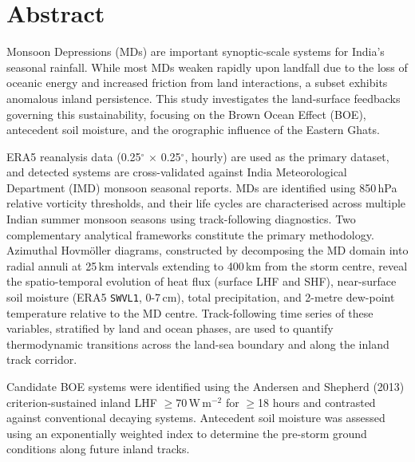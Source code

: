 
\cleardoublepage

\chapter*{Abstract}

  \large \textbf{\ThesisTitle}

  \vspace{0.5cm}

  \normalsize
  \noindent Monsoon Depressions (MDs) are important synoptic-scale
  systems for India's seasonal rainfall. While most MDs weaken
  rapidly upon landfall due to the loss of oceanic energy and
  increased friction from land interactions, a subset exhibits
  anomalous inland persistence. This study investigates the
  land-surface feedbacks governing this sustainability, focusing on
  the Brown Ocean Effect (BOE), antecedent soil moisture, and the
  orographic influence of the Eastern Ghats.

  \vspace{0.2cm}

  \noindent ERA5 reanalysis data (0.25\(^\circ\) $\times$
  0.25\(^\circ\), hourly) are used as the primary dataset, and
  detected systems are cross-validated against India Meteorological
  Department (IMD) monsoon seasonal reports. MDs are identified using
  850\,hPa relative vorticity thresholds, and their life cycles are
  characterised across multiple Indian summer monsoon seasons using
  track-following diagnostics. Two complementary analytical
  frameworks constitute the primary methodology. Azimuthal
  Hovm\"{o}ller diagrams, constructed by decomposing the MD domain
  into radial annuli at 25\,km intervals extending to 400\,km from
  the storm centre, reveal the spatio-temporal evolution of heat flux
  (surface LHF and SHF), near-surface soil moisture (ERA5
  \texttt{SWVL1}, 0-7\,cm), total precipitation, and 2-metre
  dew-point temperature relative to the MD centre. Track-following
  time series of these variables, stratified by land and ocean
  phases, are used to quantify thermodynamic transitions across the
  land-sea boundary and along the inland track corridor.

  \vspace{0.2cm}

  \noindent Candidate BOE systems were identified using the Andersen
  and Shepherd (2013) criterion-sustained inland LHF $\geq
  70$\,W\,m$^{-2}$ for $\geq$18 hours and contrasted against
  conventional decaying systems. Antecedent soil moisture was
  assessed using an exponentially weighted index to determine the
  pre-storm ground conditions along future inland tracks.

